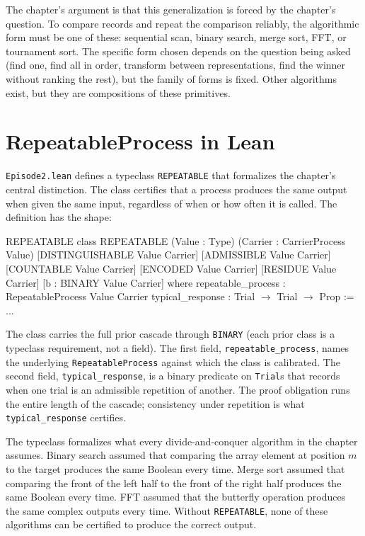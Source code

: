The chapter's argument is that this generalization is forced by the
chapter's question. To compare records and repeat the comparison reliably,
the algorithmic form must be one of these: sequential scan, binary search,
merge sort, FFT, or tournament sort. The specific form chosen depends on
the question being asked (find one, find all in order, transform between
representations, find the winner without ranking the rest), but the family
of forms is fixed. Other algorithms exist, but they are compositions of
these primitives.

\section{RepeatableProcess in Lean}
\label{se:repeatableprocess-in-lean}

\texttt{Episode2.lean} defines a typeclass \texttt{REPEATABLE} that
formalizes the chapter's central distinction. The class certifies that a
process produces the same output when given the same input, regardless of
when or how often it is called. The definition has the shape:

\begin{leanexcerpt}{REPEATABLE}
class REPEATABLE
    (Value : Type)
    (Carrier : CarrierProcess Value)
    [DISTINGUISHABLE Value Carrier] [ADMISSIBLE Value Carrier]
    [COUNTABLE Value Carrier]       [ENCODED Value Carrier]
    [RESIDUE Value Carrier]
    [b : BINARY Value Carrier]
  where
  repeatable_process : RepeatableProcess Value Carrier
  typical_response   : Trial $\to$ Trial $\to$ Prop := ...
\end{leanexcerpt}

The class carries the full prior cascade through \texttt{BINARY} (each
prior class is a typeclass requirement, not a field). The first field,
\texttt{repeatable\_process}, names the underlying
\texttt{RepeatableProcess} against which the class is calibrated. The
second field, \texttt{typical\_response}, is a binary predicate on
\texttt{Trial}s that records when one trial is an admissible
repetition of another. The proof obligation runs the entire length of
the cascade; consistency under repetition is what
\texttt{typical\_response} certifies.

The typeclass formalizes what every divide-and-conquer algorithm in the
chapter assumes. Binary search assumed that comparing the array element at
position $m$ to the target produces the same Boolean every time. Merge
sort assumed that comparing the front of the left half to the front of
the right half produces the same Boolean every time. FFT assumed that the
butterfly operation produces the same complex outputs every time. Without
\texttt{REPEATABLE}, none of these algorithms can be certified to produce
the correct output.

